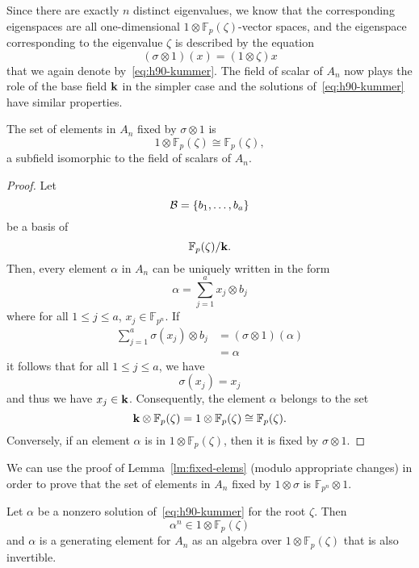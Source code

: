 Since there are exactly $n$ distinct eigenvalues, we know that the
corresponding eigenspaces are all one-dimensional
$1\otimes\mathbb{F}_{p}(\zeta)$-vector spaces, and the eigenspace corresponding
to the eigenvalue $\zeta$ is described by the equation
 \begin{equation}
   \tag{H90}
   (\sigma\otimes1)(x) = (1\otimes\zeta) x
   \label{eq:h90-kummer}
 \end{equation}
 that we again denote by~\eqref{eq:h90-kummer}. The field of scalar of $A_n$ now
 plays the role of the base field $\mathbf{k}$ in the simpler case and the solutions
 of~\eqref{eq:h90-kummer} have similar properties.
 \begin{lm}
   \label{lm:fixed-elems}
   The set of elements in $A_n$ fixed by $\sigma\otimes1$ is
   \[
     1\otimes\mathbb{F}_{p}(\zeta)\cong \mathbb{F}_{p}(\zeta),
   \]
   a subfield isomorphic to the field of scalars of $A_n$.
 \end{lm}
 \begin{proof}
   Let 
   \[
     \mathcal{B} = \left\{ b_1, \dots, b_a \right\}
   \]
   be a basis of
   \[
     \mathbb{F}_p(\zeta)/\mathbf{k}.
   \]
   Then, every element $\alpha$ in $A_n$ can be uniquely written in the form
   \[
     \alpha = \sum_{j=1}^a x_j\otimes b_j
   \]
   where for all $1\leq j\leq a$, $x_j\in\mathbb{F}_{p^n}$. If 
   \begin{align*}
     \sum_{j=1}^a\sigma(x_j)\otimes b_j &= (\sigma\otimes1)(\alpha)\\
     &= \alpha
   \end{align*}
 it follows that for all $1\leq j\leq a$, we have
   \[
     \sigma(x_j) = x_j
   \]
   and thus we have $x_j\in\mathbf{k}$. Consequently, the element $\alpha$ belongs to
   the set
   \[
     \mathbf{k}\otimes\mathbb{F}_{p}(\zeta) =
     1\otimes\mathbb{F}_p(\zeta)\cong\mathbb{F}_p(\zeta).
   \]
   Conversely, if an element $\alpha$ is in $1\otimes\mathbb{F}_{p}(\zeta)$,
   then it is fixed by $\sigma\otimes1$.
 \end{proof}
 \begin{rem}
   \label{rem:fixed-elems}
   We can use the proof of Lemma~\ref{lm:fixed-elems} (modulo appropriate
   changes) in order to prove that the set of elements in $A_n$ fixed by
   $1\otimes\sigma$ is $\mathbb{F}_{p^n}\otimes1.$
 \end{rem}
 \begin{lm}
   Let $\alpha$ be a nonzero solution of~\eqref{eq:h90-kummer} for the root
   $\zeta$. Then 
   \[
     \alpha^n\in 1\otimes\mathbb{F}_{p}(\zeta)
   \]
   and $\alpha$ is a generating element for $A_n$ as an algebra over
   $1\otimes\mathbb{F}_{p}(\zeta)$ that is also invertible.
 \end{lm}
